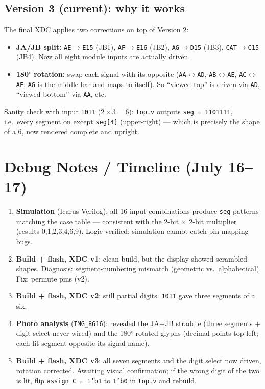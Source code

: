 \documentclass[11pt]{article}
\begin{document}
\subsection{Version 3 (current): why it works}

The final XDC applies two corrections on top of Version 2:

\begin{itemize}
  \item \textbf{JA/JB split:} \texttt{AE}$\to$\texttt{E15} (JB1),
    \texttt{AF}$\to$\texttt{E16} (JB2), \texttt{AG}$\to$\texttt{D15}
    (JB3), \texttt{CAT}$\to$\texttt{C15} (JB4). Now all eight module
    inputs are actually driven.
  \item \textbf{180$^\circ$ rotation:} swap each signal with its opposite
    (\texttt{AA}$\leftrightarrow$\texttt{AD},
    \texttt{AB}$\leftrightarrow$\texttt{AE},
    \texttt{AC}$\leftrightarrow$\texttt{AF}; \texttt{AG} is the middle
    bar and maps to itself). So ``viewed top'' is driven via \texttt{AD},
    ``viewed bottom'' via \texttt{AA}, etc.
\end{itemize}

Sanity check with input \texttt{1011} ($2\times3=6$): \texttt{top.v}
outputs \texttt{seg = 1101111}, i.e.\ every segment on except
\texttt{seg[4]} (upper-right) --- which is precisely the shape of a 6,
now rendered complete and upright.

\section{Debug Notes / Timeline (July 16--17)}

\begin{enumerate}
  \item \textbf{Simulation} (Icarus Verilog): all 16 input combinations
    produce \texttt{seg} patterns matching the case table --- consistent
    with the 2-bit $\times$ 2-bit multiplier (results 0,1,2,3,4,6,9).
    Logic verified; simulation cannot catch pin-mapping bugs.
  \item \textbf{Build + flash, XDC v1}: clean build, but the display
    showed scrambled shapes. Diagnosis: segment-numbering mismatch
    (geometric vs.\ alphabetical). Fix: permute pins (v2).
  \item \textbf{Build + flash, XDC v2}: still partial digits.
    \texttt{1011} gave three segments of a six.
  \item \textbf{Photo analysis} (\texttt{IMG\_8616}): revealed the
    JA+JB straddle (three segments + digit select never wired) and the
    180$^\circ$-rotated glyphs (decimal points top-left; each lit
    segment opposite its signal name).
  \item \textbf{Build + flash, XDC v3}: all seven segments and the digit
    select now driven, rotation corrected. Awaiting visual confirmation;
    if the wrong digit of the two is lit, flip \texttt{assign C = 1'b1}
    to \texttt{1'b0} in \texttt{top.v} and rebuild.
\end{enumerate}
\end{document}
